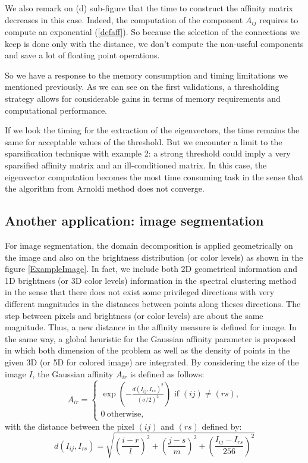 \documentclass{llncs}
\begin{document}
We also remark on (d) sub-figure that the time to construct the affinity matrix decreases in
this case. Indeed, the computation of the component $A_{ij}$ requires to
compute an exponential (\ref{defaff}). So because the selection of the connections
we keep is done only with the distance, we don't compute the non-useful
components and save a lot of floating point operations.

So we have a response to the memory consumption and timing limitations we
mentioned previously. As we can see on the first validations, a thresholding strategy allows for considerable gains in terms of memory requirements and computational performance.

If we look the timing for the extraction of the eigenvectors, the time
remains the same for acceptable values of the threshold.
But we encounter a limit to the sparsification technique with example 2: a
strong threshold could imply a very sparsified affinity matrix and an ill-conditioned matrix. 
In this case, the eigenvector computation becomes the most time consuming
task in the sense that the algorithm from Arnoldi method does not converge.


\subsection{Another application: image segmentation} \label{image}

For image segmentation, the domain decomposition is applied geometrically on the image and also on the brightness distribution (or color levels) as shown in the figure \ref{ExampleImage}. In fact, we include both 2D geometrical information and 1D 
brightness (or 3D color levels) information in the spectral clustering method
in the sense that there does not exist some privileged directions with very
different magnitudes in the distances between points along theses directions.
The step between pixels and brightness (or color levels) are about the same
magnitude.
Thus, a new distance in the affinity measure is defined for image. In the same
way, a global heuristic for the Gaussian affinity parameter is proposed in
which both dimension of the problem as  well as the density of points in the
given 3D (or 5D for colored image) are integrated.  By considering the size of
the image $I$, the Gaussian affinity $A_{ir}$ is defined as follows:
\begin{equation}
A_{ir}=\begin{cases}
\exp\left(-\frac{d\left(I_{ij},I_{rs}\right)^2}{(\sigma/2)^2}\right) \text{\  if $(ij)\neq (rs)$,}\\ 
0 \ \text{otherwise,} \nonumber
\end{cases}
\end{equation}
with the distance between the pixel $(ij)$ and $(rs)$ defined by:
\begin{equation}
d\left(I_{ij},I_{rs}\right)=\sqrt{\left(\frac{i-r}{l}\right)^2+\left(\frac{j-s}{m}\right)^2+\left(\frac{I_{ij}-I_{rs}}{256}\right)^2}
\label{puceaff}
\end{equation}
\end{document}

